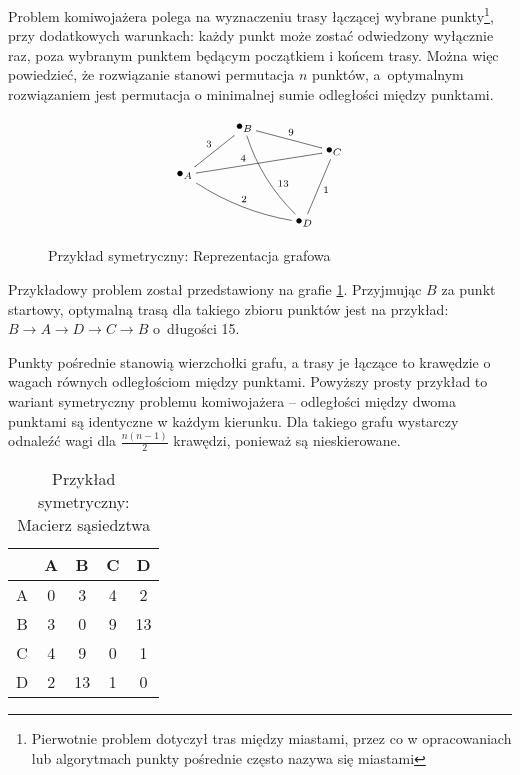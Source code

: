 Problem komiwojażera polega na wyznaczeniu trasy łączącej wybrane punkty\footnote{Pierwotnie problem dotyczył tras między miastami, przez co w opracowaniach lub algorytmach punkty pośrednie często nazywa się miastami}, przy dodatkowych warunkach: każdy punkt może zostać odwiedzony wyłącznie raz, poza wybranym punktem będącym początkiem i końcem trasy. Można więc powiedzieć, że rozwiązanie stanowi permutacja $n$ punktów, a~optymalnym rozwiązaniem jest permutacja o minimalnej sumie odległości między punktami\cite{genetyczne}.

\begin{figure}[h!]
	\begin{displaymath}
	\xygraph{
		!{<0cm,0cm>;<1.5cm,0cm>:<0cm,1.2cm>::}
		!{(0,0) }*+{\bullet_{A}}="a"
		!{(1,1) }*+{\bullet_{B}}="b"
		!{(2.5,0.5) }*+{\bullet_{C}}="c"
		!{(2,-1)}*+{\bullet_{D}}="d"
		"a"-"b" ^3
		"a"-"c" ^(0.4)4
		"a"-@/_/"d" ^2
		"b"-"c" ^9
		"b"-@/_/"d" ^(0.6){13} 
		"c"-"d" ^1
	}
\end{displaymath}
\caption{Przykład symetryczny: Reprezentacja grafowa}
\label{fig:przyklad1_komiwojazer_graf}
\end{figure}
Przykładowy problem został przedstawiony na grafie \ref{fig:przyklad1_komiwojazer_graf}. Przyjmując $B$ za punkt startowy, optymalną trasą dla takiego zbioru punktów jest na przykład: $B \to A \to D \to C \to B$ o~długości 15.

Punkty pośrednie stanowią wierzchołki grafu, a trasy je łączące to krawędzie o wagach równych odległościom między punktami. Powyższy prosty przykład to wariant symetryczny problemu komiwojażera -- odległości między dwoma punktami są identyczne w każdym kierunku. Dla takiego grafu wystarczy odnaleźć wagi dla $\frac{n(n-1)}{2}$ krawędzi, ponieważ są nieskierowane.

\begin{table}
	\begin{center}
		\begin{tabular}
			{  c | c c c c }
			& A & B & C & D \\
			\hline
			A & 0 & 3 & 4 & 2 \\
			B & 3 & 0 & 9 &13 \\
			C & 4 & 9 & 0 & 1 \\
			D & 2 &13 & 1 & 0 \\
		\end{tabular}
	\end{center}
	\caption{Przykład symetryczny: Macierz sąsiedztwa}
\end{table}

